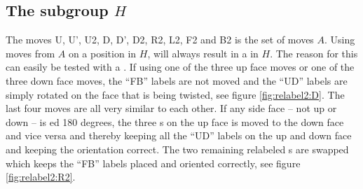 \subsection{The subgroup $H$}
\label{sub:theSubgroupH}
The moves U, U', U2, D, D', D2, R2, L2, F2 and B2 is the set of moves $A$. Using moves from $A$ on a position in $H$, will always result in a \rubik{} in $H$. The reason for this can easily be tested with a \rubik{}. If using one of the three up face moves or one of the three down face moves, the ``FB'' labels are not moved and the ``UD'' labels are simply rotated on the face that is being twisted, see figure \ref{fig:relabel2:D}. The last four moves are all very similar to each other. If any side face -- not up or down -- is \twist{}ed 180 degrees, the three \facelet{}s on the up face is moved to the down face and vice versa and thereby keeping all the ``UD'' labels on the up and down face and keeping the orientation correct. The two remaining relabeled \facelet{}s are swapped which keeps the ``FB'' labels placed and oriented correctly, see figure \ref{fig:relabel2:R2}.


\begin{figure}[!hb]
	\centering
	\hspace{0.05\textwidth}
	\caption{}
	\label{fig:relabel2}
\end{figure}
